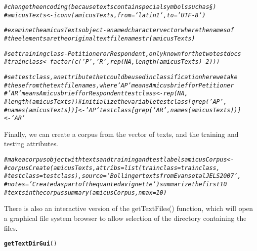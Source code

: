 \documentclass[11pt]{article}\usepackage[]{graphicx}\usepackage[]{color}
\makeatletter
\newcommand{\hlcom}[1]{\textcolor[rgb]{0.678,0.584,0.686}{\textit{#1}}}%
\newcommand{\hlstd}[1]{\textcolor[rgb]{0.345,0.345,0.345}{#1}}%
\newcommand{\hlkwd}[1]{\textcolor[rgb]{0.737,0.353,0.396}{\textbf{#1}}}%
\newenvironment{kframe}{%
 \def\at@end@of@kframe{}%
 \ifinner\ifhmode%
  \def\at@end@of@kframe{\end{minipage}}%
  \begin{minipage}{\columnwidth}%
 \fi\fi%
 \def\FrameCommand##1{\hskip\@totalleftmargin \hskip-\fboxsep
 \colorbox{shadecolor}{##1}\hskip-\fboxsep
     \hskip-\linewidth \hskip-\@totalleftmargin \hskip\columnwidth}%
 \MakeFramed {\advance\hsize-\width
   \@totalleftmargin\z@ \linewidth\hsize
   \@setminipage}}%
 {\par\unskip\endMakeFramed%
 \at@end@of@kframe}
\newenvironment{knitrout}{}{} %
\makeatother
\begin{document}
\begin{knitrout}\footnotesize
{}\color{fgcolor}\begin{kframe}
\begin{alltt}
\hlcom{# change the encoding (because texts contain special symbols such as §)}
\hlcom{# amicusTexts <- iconv(amicusTexts, from='latin1', to='UTF-8')}

\hlcom{# examine the amicusTexts object - a named character vector where the names of}
\hlcom{# the elements are the original text filename str(amicusTexts)}

\hlcom{# set training class - Petitioner or Respondent, only known for the two test docs}
\hlcom{# trainclass <- factor(c('P', 'R', rep(NA, length(amicusTexts)-2)))}

\hlcom{# set test class, an attribute that could be used in classification here we take}
\hlcom{# these from the text filenames, where 'AP' means Amicus brief for Petitioner}
\hlcom{# 'AR' means Amicus brief for Respondent testclass <- rep(NA,}
\hlcom{# length(amicusTexts)) # initialize the variable testclass[grep('AP',}
\hlcom{# names(amicusTexts))] <- 'AP' testclass[grep('AR', names(amicusTexts))] <- 'AR'}
\end{alltt}
\end{kframe}
\end{knitrout}



Finally, we can create a corpus from the vector of texts, and the training and testing attributes.

\begin{knitrout}\footnotesize
{}\color{fgcolor}\begin{kframe}
\begin{alltt}
\hlcom{# make a corpus object with texts and training and test labels amicusCorpus <-}
\hlcom{# corpusCreate(amicusTexts, attribs = list(trainclass=trainclass,}
\hlcom{# testclass=testclass), source = 'Bollinger texts from Evans et al JELS 2007',}
\hlcom{# notes = 'Created as part of the quanteda vignette') summarize the first 10}
\hlcom{# texts in the corpus summary(amicusCorpus, nmax=10)}
\end{alltt}
\end{kframe}
\end{knitrout}


There is also an interactive version of the getTextFiles() function, which will open a graphical file system browser to allow selection of the directory containing the files.
\begin{knitrout}\footnotesize
{}\color{fgcolor}\begin{kframe}
\begin{alltt}
\hlkwd{getTextDirGui}\hlstd{()}
\end{alltt}
\end{kframe}
\end{knitrout}
\end{document}
